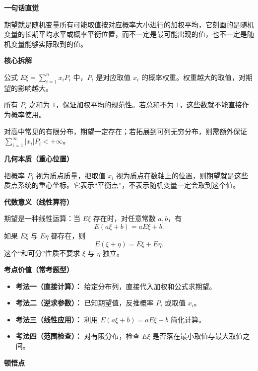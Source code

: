 \begin{explanationbox}
	\textbf{\textcolor{CExplanation}{一句话直觉}}

	期望就是随机变量所有可能取值按对应概率大小进行的加权平均，它刻画的是随机变量的长期平均水平或概率平衡位置，而不一定是最可能出现的值，也不一定是随机变量能够实际取到的值。

	\medskip
	\textbf{\textcolor{CExplanation}{核心拆解}}
	\begin{description}[style=nextline, leftmargin=2.8em, labelsep=0.5em, itemsep=0.45em]
		\item[\textbf{要点一（加权平均）：}] 公式 $E\xi=\sum_{i=1}^{n}x_iP_i$ 中，$P_i$ 是对应取值 $x_i$ 的概率权重。权重越大的取值，对期望的影响越大。
		\item[\textbf{要点二（归一条件）：}] 所有 $P_i$ 之和为 $1$，保证加权平均的规范性。若总和不为 $1$，这些数就不能直接作为概率使用。
		\item[\textbf{要点三（存在条件）：}] 对高中常见的有限分布，期望一定存在；若拓展到可列无穷分布，则需额外保证 $\sum_{i=1}^{\infty}|x_i|P_i<+\infty$。
	\end{description}

	\medskip
	\textbf{\textcolor{CExplanation}{几何本质（重心位置）}}

	把概率 $P_i$ 视为质点质量，把取值 $x_i$ 视为质点在数轴上的位置，则期望就是这些质点系统的重心坐标。它表示“平衡点”，不表示随机变量一定会取到这个值。

	\medskip
	\textbf{\textcolor{CExplanation}{代数意义（线性算符）}}

	期望是一种线性运算：当 $E\xi$ 存在时，对任意常数 $a,b$，有
	\[
		E(a\xi+b)=aE\xi+b.
	\]
	如果 $E\xi$ 与 $E\eta$ 都存在，则
	\[
		E(\xi+\eta)=E\xi+E\eta.
	\]
	这个“和可分”性质不要求 $\xi$ 与 $\eta$ 独立。

	\medskip
	\textbf{\textcolor{CExplanation}{考点价值（常考题型）}}
	\begin{itemize}[leftmargin=*, itemsep=0.5em, topsep=0.4em]
		\item \textbf{考法一（直接计算）：} 给定分布列，直接代入加权和公式求期望。
		\item \textbf{考法二（逆求参数）：} 已知期望值，反推概率 $P_i$ 或取值 $x_i$。
		\item \textbf{考法三（线性应用）：} 利用 $E(a\xi+b)=aE\xi+b$ 简化计算。
		\item \textbf{考法四（范围检查）：} 对有限分布，检查 $E\xi$ 是否落在最小取值与最大取值之间。
	\end{itemize}

	\medskip
	\textbf{\textcolor{CExplanation}{顿悟点}}


\end{explanationbox}
